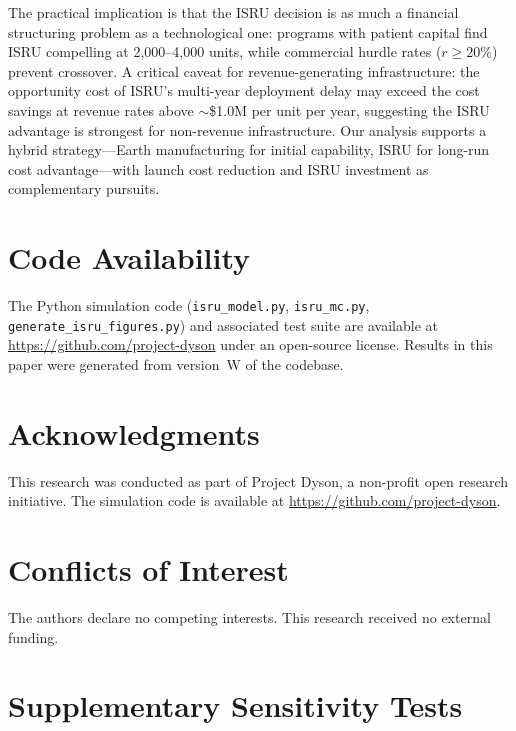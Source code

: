 \documentclass[preprint,12pt]{elsarticle}
\begin{document}
The practical implication is that the ISRU decision is as much a financial structuring problem as a technological one: programs with patient capital find ISRU compelling at 2{,}000--4{,}000 units, while commercial hurdle rates ($r \geq 20\%$) prevent crossover. A critical caveat for revenue-generating infrastructure: the opportunity cost of ISRU's multi-year deployment delay may exceed the cost savings at revenue rates above $\sim$\$1.0M per unit per year, suggesting the ISRU advantage is strongest for non-revenue infrastructure. Our analysis supports a hybrid strategy---Earth manufacturing for initial capability, ISRU for long-run cost advantage---with launch cost reduction and ISRU investment as complementary pursuits.

\section*{Code Availability}

The Python simulation code (\texttt{isru\_model.py}, \texttt{isru\_mc.py}, \texttt{generate\_isru\_figures.py}) and associated test suite are available at \url{https://github.com/project-dyson} under an open-source license. Results in this paper were generated from version~W of the codebase.


\section*{Acknowledgments}

This research was conducted as part of Project Dyson, a non-profit open research initiative. The simulation code is available at \url{https://github.com/project-dyson}.

\section*{Conflicts of Interest}

The authors declare no competing interests. This research received no external funding.

\appendix
\section{Supplementary Sensitivity Tests}
\label{sec:appendix_sensitivity}
\end{document}
